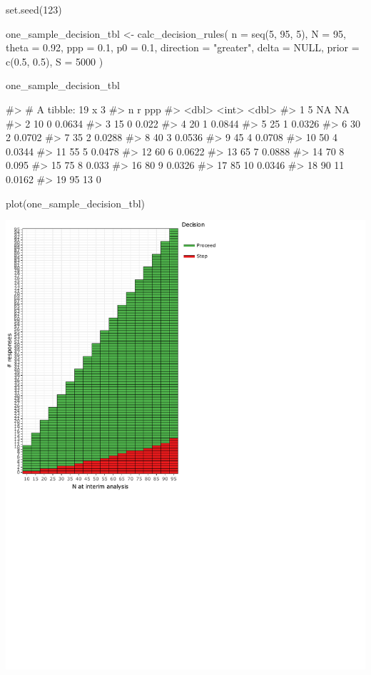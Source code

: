 \begin{Schunk}
\begin{Sinput}
set.seed(123)

one_sample_decision_tbl <- 
  calc_decision_rules(
    n = seq(5, 95, 5),
    N = 95, 
    theta = 0.92, 
    ppp = 0.1, 
    p0 = 0.1, 
    direction = "greater",
    delta = NULL, 
    prior = c(0.5, 0.5), 
    S = 5000
    )
\end{Sinput}
\end{Schunk}

\begin{Schunk}
\begin{Sinput}
one_sample_decision_tbl
\end{Sinput}
\begin{Soutput}
#> # A tibble: 19 x 3
#>        n     r     ppp
#>    <dbl> <int>   <dbl>
#>  1     5    NA NA     
#>  2    10     0  0.0634
#>  3    15     0  0.022 
#>  4    20     1  0.0844
#>  5    25     1  0.0326
#>  6    30     2  0.0702
#>  7    35     2  0.0288
#>  8    40     3  0.0536
#>  9    45     4  0.0708
#> 10    50     4  0.0344
#> 11    55     5  0.0478
#> 12    60     6  0.0622
#> 13    65     7  0.0888
#> 14    70     8  0.095 
#> 15    75     8  0.033 
#> 16    80     9  0.0326
#> 17    85    10  0.0346
#> 18    90    11  0.0162
#> 19    95    13  0
\end{Soutput}
\end{Schunk}

\begin{Schunk}
\begin{Sinput}
plot(one_sample_decision_tbl)
\end{Sinput}

\includegraphics{zabor-hobbs-kane_files/figure-latex/unnamed-chunk-10-1} \end{Schunk}

